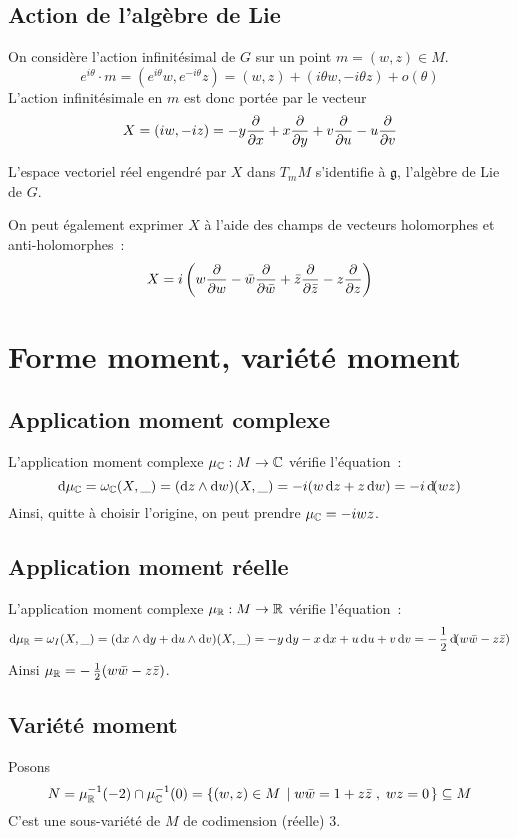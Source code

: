 \documentclass[a4paper,10pt]{article}
\begin{document}
\subsection{Action de l'algèbre de Lie}
On considère l'action infinitésimal de $G$ sur un point $m=(w,z) \in M$.
\[
e^{i\theta} \cdot m = (e^{i\theta}w , e^{-i\theta}z) = (w,z) + (i\theta w,-i\theta z) + o(\theta)
\]
L'action infinitésimale en $m$ est donc portée par le vecteur 
\[
X = (iw,-iz) = -y\dfrac{\partial{}}{\partial{x}} + x\dfrac{\partial{}}{\partial{y}} + v\dfrac{\partial{}}{\partial{u}}-u\dfrac{\partial{}}{\partial{v}}
\]

L'espace vectoriel réel engendré par $X$ dans $T_mM$ s'identifie à $\mathfrak{g}$, l'algèbre de Lie de $G$.

On peut également exprimer $X$ à l'aide des champs de vecteurs holomorphes et anti-holomorphes~:
\[
X = i\left(
w\dfrac{\partial{}}{\partial{w}}-\bar{w}\dfrac{\partial{}}{\partial{\bar{w}}} + \bar{z}\dfrac{\partial{}}{\partial{\bar{z}}}-z\dfrac{\partial{}}{\partial{z}}
\right)
\]


\section{Forme moment, variété moment}

\subsection{Application moment complexe}
L'application moment complexe $\mu_{\mathbb{C}} : M \rightarrow \mathbb{C}$ vérifie l'équation~:
\[
\operatorname{d\!} \mu_{\mathbb{C}} = \omega_{\mathbb{C}}(X,\_) = (\operatorname{d\!} z \wedge \operatorname{d\!} w) (X,\_) = -i(w\operatorname{d\!} z + z\operatorname{d\!} w) =-i \operatorname{d\!} (wz)
\]
Ainsi, quitte à choisir l'origine, on peut prendre $\mu_{\mathbb{C}} = -iwz$.

\subsection{Application moment réelle}
L'application moment complexe $\mu_{\mathbb{R}} : M \rightarrow \mathbb{R}$ vérifie l'équation~:
\[
\dd \mu_\R = \omega_I(X,\_) = (\dd x \wedge \dd y + \dd u \wedge \dd v) (X,\_) = -y \dd y - x \dd x + u \dd u + v \dd v = -\demi \dd (w\bar{w} - z\bar{z})
\]
Ainsi $\mu_{\mathbb{R}}= -\operatorname{\frac{1}{2}}(w\bar{w} - z\bar{z})$.

\subsection{Variété moment}
Posons 
\[
N = \mu_{\mathbb{R}}^{-1}(-2) \cap \mu_{\mathbb{C}}^{-1}(0) = \left\lbrace {(w,z) \in M} \; \left| \; {w\bar{w} = 1 + z \bar{z} \; , \; wz = 0} \right. \right\rbrace \subseteq M
\]
C'est une sous-variété de $M$ de codimension (réelle) $3$.
\end{document}
